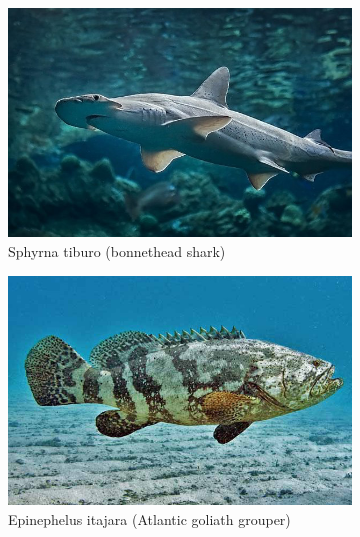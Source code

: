 \documentclass[10pt]{article}
\begin{document}
\begin{figure}[h]
     \centering
     \begin{subfigure}[b]{0.48\textwidth}
         \centering
         \includegraphics[width=\textwidth]{images/sphyrna_tiburo.jpg}
         \caption{Sphyrna tiburo (bonnethead shark)}
     \end{subfigure}
     \hfill
     \begin{subfigure}[b]{0.48\textwidth}
         \centering
         \includegraphics[width=\textwidth]{images/epinephelus_itajara.jpg}
         \caption{Epinephelus itajara (Atlantic goliath grouper)}
     \end{subfigure}
     \hfill
     \begin{subfigure}[b]{0.48\textwidth}
         \centering

\end{subfigure}
\end{figure}
\end{document}
